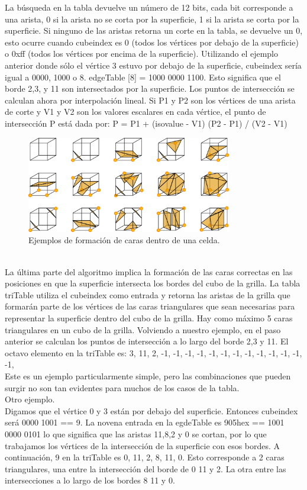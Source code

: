 \documentclass[12pt]{article}
\begin{document}
La búsqueda en la tabla devuelve un número de 12 bits, cada bit corresponde a una arista, 0 si la arista no se corta por la superficie, 1 si la arista se corta por la superficie. Si ninguno de las aristas retorna un corte en la tabla, se devuelve un 0, esto ocurre cuando cubeindex es 0 (todos los vértices por debajo de la superficie) o 0xff (todos los vértices por encima de la superficie).
Utilizando el ejemplo anterior donde sólo el vértice 3 estuvo por debajo de la superficie, cubeindex sería igual a 0000, 1000 o 8. edgeTable [8] = 1000 0000 1100. Esto significa que el borde 2,3, y 11 son intersectados por la superficie.
Los puntos de intersección se calculan ahora por interpolación lineal. Si P1 y P2 son los vértices de una arista de corte y V1 y V2 son los valores escalares en cada vértice, el punto de intersección P está dada por:
P = P1 + (isovalue - V1) (P2 - P1) / (V2 - V1)
\begin{figure}[h!]
\includegraphics[width=0.8\textwidth,center]{marchingcubes3.png}
\caption{Ejemplos de formación de caras dentro de una celda.}
\end{figure}
\\La última parte del algoritmo implica la formación de las caras correctas en las posiciones en que la superficie intersecta los bordes del cubo de la grilla. La tabla triTable utiliza el cubeindex como entrada y retorna las aristas de la grilla que  formarán parte de los vértices de las caras triangulares que sean necesarias para representar la superficie dentro del cubo de la grilla. Hay como máximo 5 caras triangulares en un cubo de la grilla.
Volviendo a nuestro ejemplo, en el paso anterior se calculan los puntos de intersección a lo largo del borde 2,3 y 11. El octavo elemento en la triTable es:
{3, 11, 2, -1, -1, -1, -1, -1, -1, -1, -1, -1, -1, -1, -1, -1},
\\Este es un ejemplo particularmente simple, pero las combinaciones que pueden surgir no son tan evidentes para muchos de los casos de la tabla.
\\Otro ejemplo.
\\Digamos que el vértice 0 y 3 están por debajo del superficie. Entonces cubeindex será 0000 1001 == 9. La novena entrada en la egdeTable es 905hex == 1001 0000 0101 lo que significa que las aristas 11,8,2 y 0 se cortan, por lo que trabajamos los vértices de la intersección de la superficie con esos bordes.
A continuación, 9 en la triTable es 0, 11, 2, 8, 11, 0. Esto corresponde a 2 caras triangulares, una entre la intersección del borde de 0 11 y 2. La otra entre las intersecciones a lo largo de los bordes 8 11 y 0.
\end{document}
